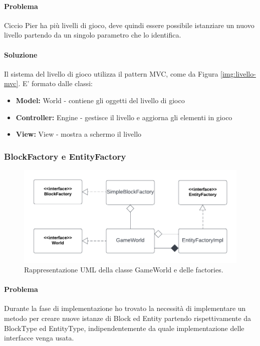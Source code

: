 \documentclass[a4paper,12pt]{report}
\begin{document}
\paragraph{Problema} Ciccio Pier ha più livelli di gioco, deve quindi essere possibile istanziare un nuovo livello partendo da un singolo parametro che lo identifica.

\paragraph{Soluzione} Il sistema del livello di gioco utilizza il pattern MVC, come da Figura  \ref{img:livello-mvc}.
E' formato dalle classi:

\begin{itemize}
    \item \textbf{Model:} World - contiene gli oggetti del livello di gioco
    \item \textbf{Controller:} Engine - gestisce il livello e aggiorna gli elementi in gioco
    \item \textbf{View:} View - mostra a schermo il livello
\end{itemize}

\subsubsection{BlockFactory e EntityFactory}

\begin{figure}[H]
\centering{}
\includegraphics[scale=1] {img/world.png}
\caption{Rappresentazione UML della classe GameWorld e delle factories.}
\label{img:world}
\end{figure}

\paragraph{Problema} Durante la fase di implementazione ho trovato la necessità di implementare un metodo per creare nuove istanze di Block ed Entity partendo rispettivamente da BlockType ed EntityType, indipendentemente da quale implementazione delle interfacce venga usata.
\end{document}
